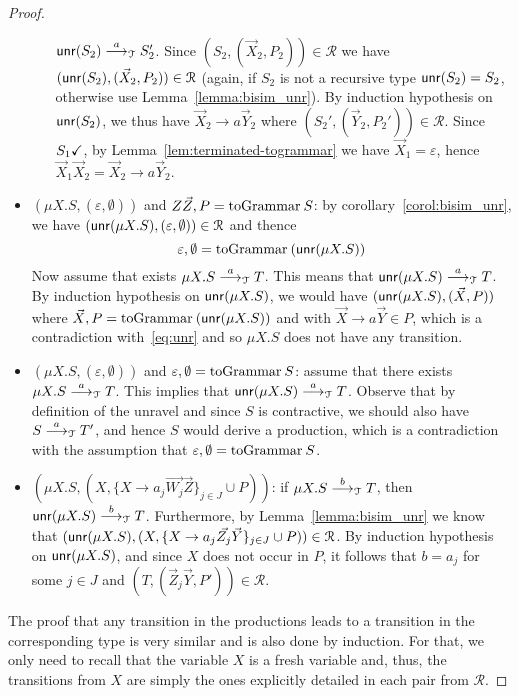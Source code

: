 \begin{proof}
\begin{itemize}
\begin{itemize}
    	$\Unravel(S_2)\LTSderives[a] S_2'$. 
    	Since $(S_2, (\vec X_2, P_2))\in \mathcal{R}$ we have 
    	$(\Unravel(S_2), (\vec X_2, P_2))\in \mathcal{R}$ (again, 
    	if $S_2$ is not a recursive type $\Unravel(S_2)=S_2$, 
    	otherwise use Lemma~\ref{lemma:bisim_unr}). 
    	By induction hypothesis on $\Unravel(S_2)$, we thus have
    	$\vec X_2 \rightarrow a \vec Y_2$ where 
    	$(S_2', (\vec Y_2,P_2'))\in \mathcal{R}$. Since $\DONE{S_1}$, by
    	Lemma~\ref{lem:terminated-togrammar} we have $\vec X_1 = \varepsilon$, 
    	hence $\vec X_1 \vec X_2 = \vec X_2 \rightarrow a \vec Y_2$.
    	\end{itemize}
    	\item $(\mu X.S, (\varepsilon, \emptyset))$ and $Z\vec Z, P = \toGrammarf{S}$: 
    	by corollary~\ref{corol:bisim_unr}, we have 
    	$(\Unravel(\mu X.S), (\varepsilon, \emptyset)) \in \mathcal{R}$ and thence
    	\begin{equation}
    	\label{eq:unr}
    		\varepsilon, \emptyset = \toGrammarf{(\Unravel(\mu X.S))}	
    	\end{equation}
    	Now assume that
    	exists $\mu X.S  \LTSderives[a] T$. This means that 
    	$\Unravel(\mu X.S) \LTSderives[a] T$. By induction hypothesis on 
    	$\Unravel(\mu X.S)$, we would have $(\Unravel(\mu X.S), (\vec X, P))$
    	where $\vec X, P = \toGrammarf{(\Unravel(\mu X.S))}$ and with
    	$\vec X \rightarrow a \vec Y \in P$, which is a contradiction 
    	with~\eqref{eq:unr} and so $\mu X.S$ does not have any transition.
		\item $(\mu X.S, (\varepsilon, \emptyset))$ and $\varepsilon, \emptyset = \toGrammarf{S}$: 
    	assume that there exists $\mu X.S  \LTSderives[a] T$. This
    	implies that $\Unravel(\mu X.S)  \LTSderives[a] T$. Observe that
    	by definition of the unravel and since $S$ is contractive, we should
    	also have $S  \LTSderives[a] T'$, and hence $S$ would derive a 
    	production, which is a contradiction with
    	the assumption that $\varepsilon, \emptyset = \toGrammarf{S}$.
    	\item $(\mu X.S, (X, \{X \rightarrow a_j \vec {W_j}\vec Z\}_{j\in J} \cup  P))$: 
    	if $\mu X.S\LTSderives[b] T$, then $\Unravel(\mu X.S)\LTSderives[b] T$.
    	Furthermore, by Lemma~\ref{lemma:bisim_unr} we know that 
    	$(\Unravel(\mu X.S), (X, \{X \rightarrow a_j \vec {Z_j}\vec Y\}_{j\in J} \cup  P))
    	\in\mathcal{R}$. By induction hypothesis on $\Unravel(\mu X.S)$, 
    	and since $X$ does not occur in $P$, it follows 
    	that $b=a_j$ for some $j\in J$ and $(T, (\vec Z_j \vec Y, P'))\in \mathcal{R}$.
	\end{itemize} 
	The proof that any transition in the productions leads to a transition in 
	the corresponding type is very similar and is also done by induction. 
	For that,
	we only need to recall that the variable $X$ is a fresh variable and, thus, 
	the transitions from $X$ are simply the ones explicitly detailed in each 
	pair from $\mathcal{R}$.
\end{proof}

